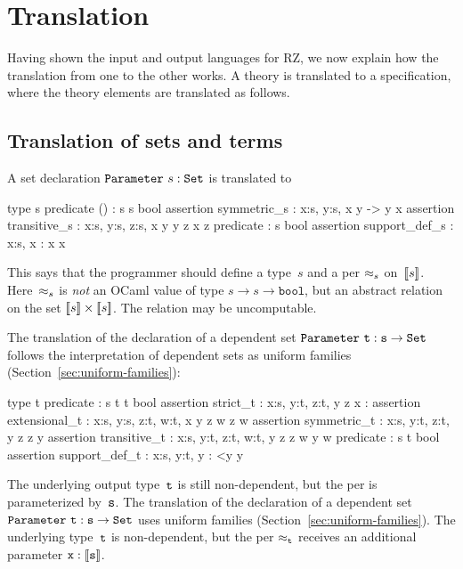 \section{Translation}
\label{sec:translation}

\iflong
Having shown the input and output languages for RZ,
we now explain how the translation from one to the other works.
A theory is translated to a
specification, where the theory elements are translated as follows.
\fi %


\subsection{Translation of sets and terms}
\label{sec:transl-sets-terms}

A set declaration $\mathtt{Parameter}\ s : \mathtt{Set}$ is translated to
%
\begin{source}
type s
predicate () : s \iTo s \iTo bool
assertion symmetric_s :  \iForall x:s, y:s, x  y -> y  x
assertion transitive_s : \iForall x:s, y:s, z:s, x  y \iAnd y  z \iTo x  z
predicate  : s \iTo bool
assertion support_def_s :  \iForall x:s,  x :  \iIff x  x
\end{source}
%
This says that the programmer should define a type~$s$ and a per
$\approx_s$ on~$[\![s]\!]$. Here~$\approx_s$ is \emph{not} an OCaml value
of type $s \to s \to \mathtt{bool}$, but an abstract relation on the
set $[\![s]\!] \times [\![s]\!]$.  The relation may be uncomputable.

\iflong
The translation of the declaration of a dependent set
$\mathtt{Parameter}\ \mathtt{t} : \mathtt{s} \to \mathtt{Set}$ follows the interpretation of dependent
sets as uniform families (Section~\ref{sec:uniform-families}):
%
\begin{source}
type t
predicate  : s \iTo t \iTo t \iTo bool
assertion strict_t :  \iForall x:s, y:t, z:t, y  z \iTo x : 
assertion extensional_t :
  \iForall x:s, y:s, z:t, w:t, x  y \iTo z  w \iTo z  w
assertion symmetric_t : \iForall x:s, y:t, z:t, y  z \iTo z  y
assertion transitive_t :
  \iForall x:s, y:t, z:t, w:t, y  z \iAnd z  w \iTo y  w
predicate  : s \iTo t \iTo bool
assertion support_def_t :  \iForall x:s, y:t, y :  <\iTo y  y
\end{source}
%
The underlying output type~$\mathtt{t}$ is still non-dependent, but the per is
parameterized by~$\mathtt{s}$.
\else %
The translation of the declaration of a dependent set
$\mathtt{Parameter}\ \mathtt{t} : \mathtt{s} \to \mathtt{Set}$ uses uniform families
(Section~\ref{sec:uniform-families}). The underlying type~$\mathtt{t}$ is
non-dependent, but the per $\approx_{\mathtt{t}}$ receives an additional
parameter $\mathtt{x} : [\![\mathtt{s}]\!]$.
\fi %

